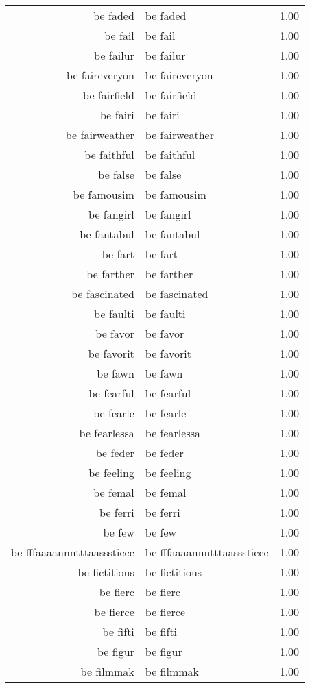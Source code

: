 \begin{table}[ht]
\begin{tabular}{rlr}
  be faded & be faded & 1.00 \\ 
  be fail & be fail & 1.00 \\ 
  be failur & be failur & 1.00 \\ 
  be faireveryon & be faireveryon & 1.00 \\ 
  be fairfield & be fairfield & 1.00 \\ 
  be fairi & be fairi & 1.00 \\ 
  be fairweather & be fairweather & 1.00 \\ 
  be faithful & be faithful & 1.00 \\ 
  be false & be false & 1.00 \\ 
  be famousim & be famousim & 1.00 \\ 
  be fangirl & be fangirl & 1.00 \\ 
  be fantabul & be fantabul & 1.00 \\ 
  be fart & be fart & 1.00 \\ 
  be farther & be farther & 1.00 \\ 
  be fascinated & be fascinated & 1.00 \\ 
  be faulti & be faulti & 1.00 \\ 
  be favor & be favor & 1.00 \\ 
  be favorit & be favorit & 1.00 \\ 
  be fawn & be fawn & 1.00 \\ 
  be fearful & be fearful & 1.00 \\ 
  be fearle & be fearle & 1.00 \\ 
  be fearlessa & be fearlessa & 1.00 \\ 
  be feder & be feder & 1.00 \\ 
  be feeling & be feeling & 1.00 \\ 
  be femal & be femal & 1.00 \\ 
  be ferri & be ferri & 1.00 \\ 
  be few & be few & 1.00 \\ 
  be fffaaaannntttaasssticcc & be fffaaaannntttaasssticcc & 1.00 \\ 
  be fictitious & be fictitious & 1.00 \\ 
  be fierc & be fierc & 1.00 \\ 
  be fierce & be fierce & 1.00 \\ 
  be fifti & be fifti & 1.00 \\ 
  be figur & be figur & 1.00 \\ 
  be filmmak & be filmmak & 1.00 \\ 

\end{tabular}
\end{table}
